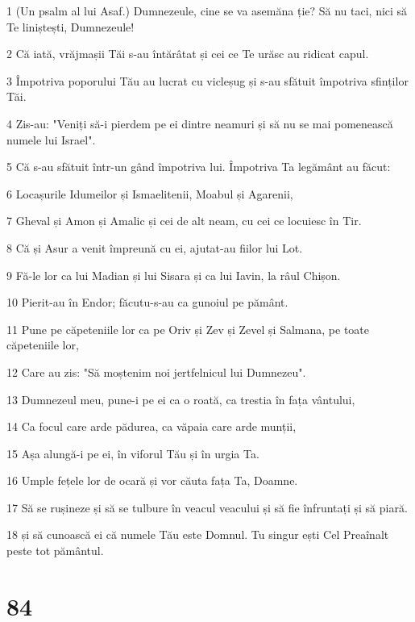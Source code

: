 \par 1 (Un psalm al lui Asaf.) Dumnezeule, cine se va asemăna ție? Să nu taci, nici să Te liniștești, Dumnezeule!
\par 2 Că iată, vrăjmașii Tăi s-au întărâtat și cei ce Te urăsc au ridicat capul.
\par 3 Împotriva poporului Tău au lucrat cu vicleșug și s-au sfătuit împotriva sfinților Tăi.
\par 4 Zis-au: "Veniți să-i pierdem pe ei dintre neamuri și să nu se mai pomenească numele lui Israel".
\par 5 Că s-au sfătuit într-un gând împotriva lui. Împotriva Ta legământ au făcut:
\par 6 Locașurile Idumeilor și Ismaelitenii, Moabul și Agarenii,
\par 7 Gheval și Amon și Amalic și cei de alt neam, cu cei ce locuiesc în Tir.
\par 8 Că și Asur a venit împreună cu ei, ajutat-au fiilor lui Lot.
\par 9 Fă-le lor ca lui Madian și lui Sisara și ca lui Iavin, la râul Chișon.
\par 10 Pierit-au în Endor; făcutu-s-au ca gunoiul pe pământ.
\par 11 Pune pe căpeteniile lor ca pe Oriv și Zev și Zevel și Salmana, pe toate căpeteniile lor,
\par 12 Care au zis: "Să moștenim noi jertfelnicul lui Dumnezeu".
\par 13 Dumnezeul meu, pune-i pe ei ca o roată, ca trestia în fața vântului,
\par 14 Ca focul care arde pădurea, ca văpaia care arde munții,
\par 15 Așa alungă-i pe ei, în viforul Tău și în urgia Ta.
\par 16 Umple fețele lor de ocară și vor căuta fața Ta, Doamne.
\par 17 Să se rușineze și să se tulbure în veacul veacului și să fie înfruntați și să piară.
\par 18 și să cunoască ei că numele Tău este Domnul. Tu singur ești Cel Preaînalt peste tot pământul.

\chapter{84}

